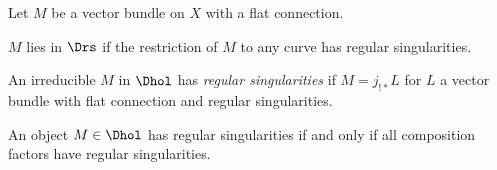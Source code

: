 \documentclass[etingof-dmod.tex]{subfiles}
\begin{document}
Let $M$ be a vector bundle on $X$ with a flat connection.
\begin{defn}
  $M$ lies in $\Drs$ if the restriction of $M$ to any curve has regular
  singularities.
\end{defn}
\begin{defn}
  An irreducible $M$ in $\Dhol$ has \textit{regular singularities} if
  $M = j_{!*}L$ for $L$ a vector bundle with flat connection and regular
  singularities.
\end{defn}
\begin{rmk}
  An object $M \in \Dhol$ has regular singularities if and only if all
  composition factors have regular singularities.
\end{rmk}
\end{document}
